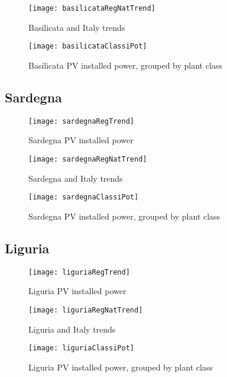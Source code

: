 \documentclass[12pt,a4paper,openright,twoside]{report}
\begin{document}
\begin{figure}[hp]
	\centering
	\texttt{[image: basilicataRegNatTrend]}
	\caption{Basilicata and Italy trends}
	\label{basilicataRegNatTrend}
\end{figure}

\begin{figure}[hp]
	\centering
	\texttt{[image: basilicataClassiPot]}
	\caption{Basilicata PV installed power, grouped by plant class}
	\label{basilicataClassiPot}
\end{figure}

\subsection*{Sardegna}

\begin{figure}[hp]
	\centering
	\texttt{[image: sardegnaRegTrend]}
	\caption{Sardegna PV installed power}
	\label{sardegnaRegTrend}
\end{figure}

\begin{figure}[hp]
	\centering
	\texttt{[image: sardegnaRegNatTrend]}
	\caption{Sardegna and Italy trends}
	\label{sardegnaRegNatTrend}
\end{figure}

\begin{figure}[hp]
	\centering
	\texttt{[image: sardegnaClassiPot]}
	\caption{Sardegna PV installed power, grouped by plant class}
	\label{sardegnaClassiPot}
\end{figure}

\clearpage

\subsection*{Liguria}

\begin{figure}[hp]
	\centering
	\texttt{[image: liguriaRegTrend]}
	\caption{Liguria PV installed power}
	\label{liguriaRegTrend}
\end{figure}

\begin{figure}[hp]
	\centering
	\texttt{[image: liguriaRegNatTrend]}
	\caption{Liguria and Italy trends}
	\label{liguriaRegNatTrend}
\end{figure}

\begin{figure}[hp]
	\centering
	\texttt{[image: liguriaClassiPot]}
	\caption{Liguria PV installed power, grouped by plant class}
	\label{liguriaClassiPot}
\end{figure}
\end{document}
